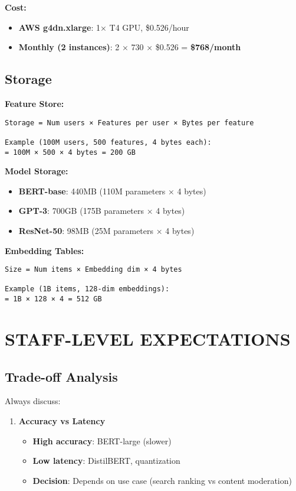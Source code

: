 \documentclass[8pt,landscape]{article}
\begin{document}
\begin{multicols}{3}
\textbf{Cost:}
\begin{itemize}
\item \textbf{AWS g4dn.xlarge}: 1× T4 GPU, \$0.526/hour
\item \textbf{Monthly (2 instances)}: 2 × 730 × \$0.526 = \textbf{\$768/month}
\end{itemize}

\subsection*{Storage}

\textbf{Feature Store:}
\begin{verbatim}
Storage = Num users × Features per user × Bytes per feature

Example (100M users, 500 features, 4 bytes each):
= 100M × 500 × 4 bytes = 200 GB
\end{verbatim}

\textbf{Model Storage:}
\begin{itemize}
\item \textbf{BERT-base}: 440MB (110M parameters × 4 bytes)
\item \textbf{GPT-3}: 700GB (175B parameters × 4 bytes)
\item \textbf{ResNet-50}: 98MB (25M parameters × 4 bytes)
\end{itemize}

\textbf{Embedding Tables:}
\begin{verbatim}
Size = Num items × Embedding dim × 4 bytes

Example (1B items, 128-dim embeddings):
= 1B × 128 × 4 = 512 GB
\end{verbatim}

\section*{STAFF-LEVEL EXPECTATIONS}

\subsection*{Trade-off Analysis}

Always discuss:
\begin{enumerate}
\item \textbf{Accuracy vs Latency}
\begin{itemize}
\item \textbf{High accuracy}: BERT-large (slower)
\item \textbf{Low latency}: DistilBERT, quantization
\item \textbf{Decision}: Depends on use case (search ranking vs content moderation)
\end{itemize}


\end{enumerate}
\end{multicols}
\end{document}
